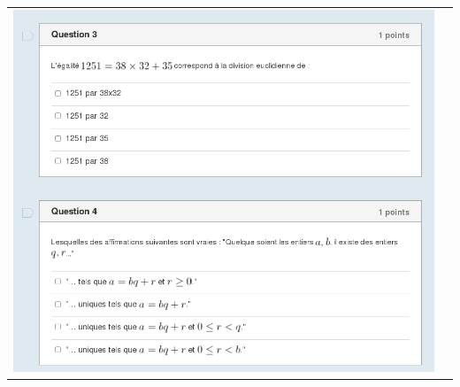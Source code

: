 \begin{frame}
\begin{tabular}{cc}
\pause
\includegraphics[scale=0.08]{Fig-crypto/img_qcm.png} \\ 
\end{tabular}


\end{frame}


